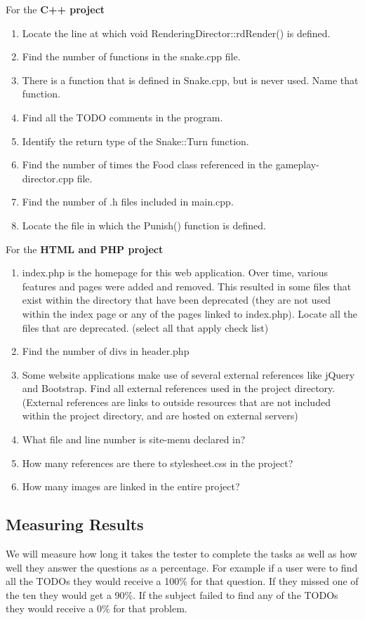 \documentclass[letterpaper,10pt,titlepage,draftclsnofoot,onecolumn,onesided] {IEEEtran}
\begin{document}
	For the \textbf{C++ project}
	\begin{enumerate}
		\item Locate the line at which void RenderingDirector::rdRender() is defined. 
		\item Find the number of functions in the snake.cpp file.
		\item There is a function that is defined in Snake.cpp, but is never used. Name that function.
		\item Find all the TODO comments in the program.
		\item Identify the return type of the Snake::Turn function.
		\item Find the number of times the Food class referenced in the gameplay-director.cpp file.
		\item Find the number of .h files included in main.cpp.
		\item Locate the file in which the Punish() function is defined.
	\end{enumerate}
	
	For the \textbf{HTML and PHP project}
	\begin{enumerate}
		\item index.php is the homepage for this web application. Over time, various features and pages were added and removed. This resulted in some files that exist within the directory that have been deprecated (they are not used within the index page or any of the pages linked to index.php). Locate all the files that are deprecated. (select all that apply check list)

		\item Find the number of divs in header.php
		\item Some website applications make use of several external references like jQuery and Bootstrap. Find all external references used in the project directory. (External references are links to outside resources that are not included within the project directory, and are hosted on external servers)

		\item What file and line number is site-menu declared in?
		\item How many references are there to stylesheet.css in the project?
		\item How many images are linked in the entire project?
	\end{enumerate}
	
	\subsection{Measuring Results}
	We will measure how long it takes the tester to complete the tasks as well as how well they answer the questions as a percentage. 
	For example if a user were to find all the TODOs they would receive a 100\% for that question. 
	If they missed one of the ten they would get a 90\%.
	If the subject failed to find any of the TODOs they would receive a 0\% for that problem.
\end{document}
